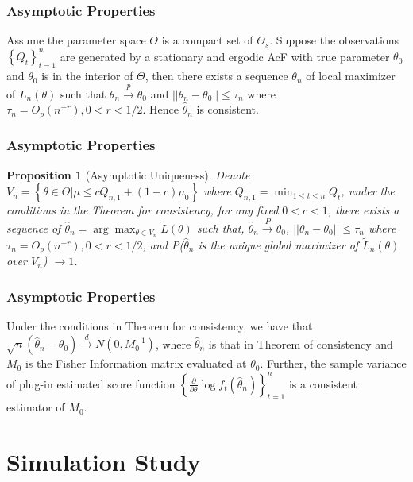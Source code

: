 \documentclass{beamer}
\newcommand{\set}[1]{\left\{#1\right\}}
\newtheorem{prop}{Proposition}[section]
\begin{document}
\begin{frame}
    \frametitle{Asymptotic Properties}
    \begin{theorem}[Consistency]
        Assume the parameter space $\Theta$ is a compact set of $\Theta_s$. Suppose the observations $\set{Q_t}_{t=1}^{n}$ are generated
        by a stationary and ergodic AcF with true parameter $\theta_0$ and $\theta_0$ is in the interior of $\Theta$, then there exists a sequence $\theta_n$ of local maximizer of $L_n(\theta)$ such that $\theta_n \stackrel{p}{\to} \theta_0$ and $||\theta_n-\theta_0||\le \tau_n$ where $\tau_n=O_p(n^{-r}), 0<r<1/2$. Hence $\hat{\theta}_n$ is consistent.
    \end{theorem}
\end{frame}

\begin{frame}
    \frametitle{Asymptotic Properties}
    \begin{prop}[Asymptotic Uniqueness]
        Denote $V_n=\set{\theta\in \Theta|\mu\le cQ_{n,1}+(1-c)\mu_0}$ where $Q_{n,1}=\min_{1\le t\le n}Q_t$, under the conditions in the Theorem for consistency, for any fixed $0<c<1$, there exists a sequence of $\hat{\theta}_n=\arg \max_{\theta\in V_n}\tilde{L}(\theta)$ such that, $\hat{\theta}_n\stackrel{P}{\to}\theta_0$, $||\theta_n-\theta_0||\le \tau_n$ where $\tau_n=O_p(n^{-r}), 0<r<1/2$, and P($\hat{\theta}_n$ is the unique global maximizer of $\tilde{L}_n(\theta)$ over $V_n$) $\to 1$. 
    \end{prop}
\end{frame}

\begin{frame}
    \frametitle{Asymptotic Properties}

    \begin{theorem}
        Under the conditions in Theorem for consistency, we have that $\sqrt{n}(\hat{\theta}_n-\theta_0)\stackrel{d}{\to} N(0,M_0^{-1})$, where $\hat{\theta}_n$ is that in Theorem of consistency and $M_0$ is the Fisher Information matrix evaluated at $\theta_0$. Further, the sample variance of plug-in estimated score function $\set{\frac{\partial}{\partial \theta}\log f_t(\hat{\theta}_n)}_{t=1}^n$ is a consistent estimator of $M_0$.
    \end{theorem}

\end{frame}


\section{Simulation Study}
\end{document}
